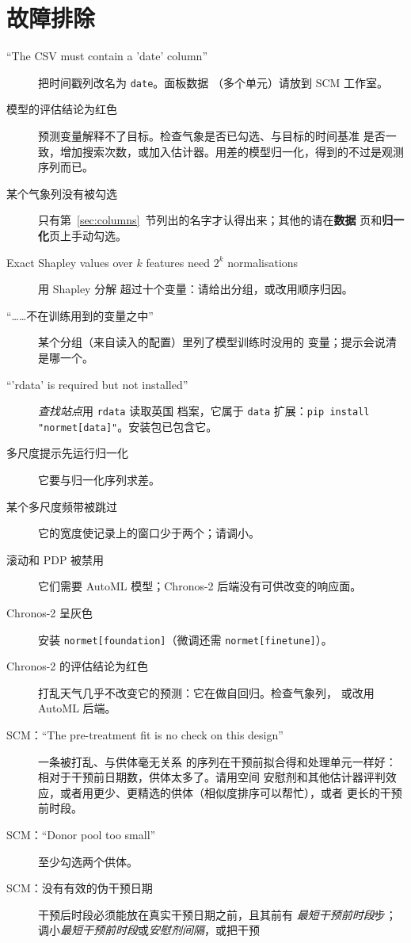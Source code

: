 \documentclass[11pt]{ctexrep}
\newcommand{\codeunderscore}{\textunderscore\allowbreak}
\newcommand{\code}[1]{\texttt{\let\_\codeunderscore #1}}
\newcommand{\tab}[1]{\textbf{#1}}
\begin{document}
\chapter{故障排除}\label{app:trouble}
\begin{description}
  \item[“The CSV must contain a 'date' column”] 把时间戳列改名为 \code{date}。面板数据
        （多个单元）请放到 SCM 工作室。
  \item[模型的评估结论为红色] 预测变量解释不了目标。检查气象是否已勾选、与目标的时间基准
        是否一致，增加搜索次数，或加入估计器。用差的模型归一化，得到的不过是观测序列而已。
  \item[某个气象列没有被勾选] 只有第~\ref{sec:columns}~节列出的名字才认得出来；其他的请在\tab{数据}
        页和\tab{归一化}页上手动勾选。
  \item[Exact Shapley values over $k$ features need $2^k$ normalisations] 用 Shapley 分解
        超过十个变量：请给出分组，或改用顺序归因。
  \item[“……不在训练用到的变量之中”] 某个分组（来自读入的配置）里列了模型训练时没用的
        变量；提示会说清是哪一个。
  \item[“'rdata' is required but not installed”] \emph{查找站点}用 \code{rdata} 读取英国
        档案，它属于 \code{data} 扩展：\code{pip install "normet[data]"}。安装包已包含它。
  \item[多尺度提示先运行归一化] 它要与归一化序列求差。
  \item[某个多尺度频带被跳过] 它的宽度使记录上的窗口少于两个；请调小。
  \item[滚动和 PDP 被禁用] 它们需要 AutoML 模型；Chronos-2 后端没有可供改变的响应面。
  \item[Chronos-2 呈灰色] 安装 \code{normet[foundation]}（微调还需 \code{normet[finetune]}）。
  \item[Chronos-2 的评估结论为红色] 打乱天气几乎不改变它的预测：它在做自回归。检查气象列，
        或改用 AutoML 后端。
  \item[SCM：“The pre-treatment fit is no check on this design”] 一条被打乱、与供体毫无关系
        的序列在干预前拟合得和处理单元一样好：相对于干预前日期数，供体太多了。请用空间
        安慰剂和其他估计器评判效应，或者用更少、更精选的供体（相似度排序可以帮忙），或者
        更长的干预前时段。
  \item[SCM：“Donor pool too small”] 至少勾选两个供体。
  \item[SCM：没有有效的伪干预日期] 干预后时段必须能放在真实干预日期之前，且其前有
        \emph{最短干预前时段}步；调小\emph{最短干预前时段}或\emph{安慰剂间隔}，或把干预

\end{description}
\end{document}
